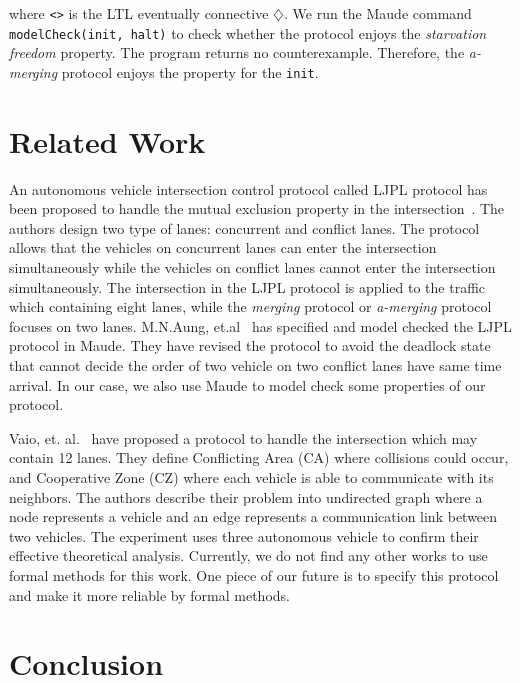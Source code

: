 \documentclass[10pt, conference, compsocconf]{IEEEtran}
\begin{document}
\noindent where \verb!<>! is the LTL eventually connective $\diamondsuit$.
We run the Maude command \verb!modelCheck(init, halt)! to check whether the protocol enjoys the \textit{starvation freedom} property.
The program returns no counterexample.
Therefore, the \textit{a-merging} protocol enjoys the property for the \verb!init!.

 
 
\section{Related Work}
 \label{sect_Relate}
 
 An autonomous vehicle intersection control protocol called LJPL protocol has been proposed to handle the mutual exclusion property in the intersection~\cite{LimJongBeom2018Aedm}.
 The authors design two type of lanes: concurrent and conflict lanes. 
 The protocol allows that the vehicles on concurrent lanes can enter the intersection simultaneously while the vehicles on conflict lanes cannot enter the intersection simultaneously.
 The intersection in the LJPL protocol is applied to the traffic which containing eight lanes, while the \textit{merging} protocol or \textit{a-merging} protocol focuses on two lanes.
 M.N.Aung, et.al~\cite{DBLP:conf/seke/AungP019} has specified and model checked the LJPL protocol in Maude.
 They have revised the protocol to avoid the deadlock state that cannot decide the order of two vehicle on two conflict lanes have same time arrival.
 In our case, we also use Maude to model check some properties of our protocol.
  
 Vaio, et. al.~\cite{8790807} have proposed a protocol to handle the intersection which may contain 12 lanes.
 They define Conflicting Area (CA) where collisions could occur, and Cooperative Zone (CZ) where each vehicle is able to communicate with its neighbors. 
 The authors describe their problem into undirected graph where a node represents a vehicle and an edge represents a communication link between two vehicles.
 The experiment uses three autonomous vehicle to confirm their effective theoretical analysis.
 Currently, we do not find any other works to use formal methods for this work.
 One piece of our future is to specify this protocol and make it more reliable by formal methods.
 
 








\section{Conclusion}
\label{concl_sect}
\end{document}
